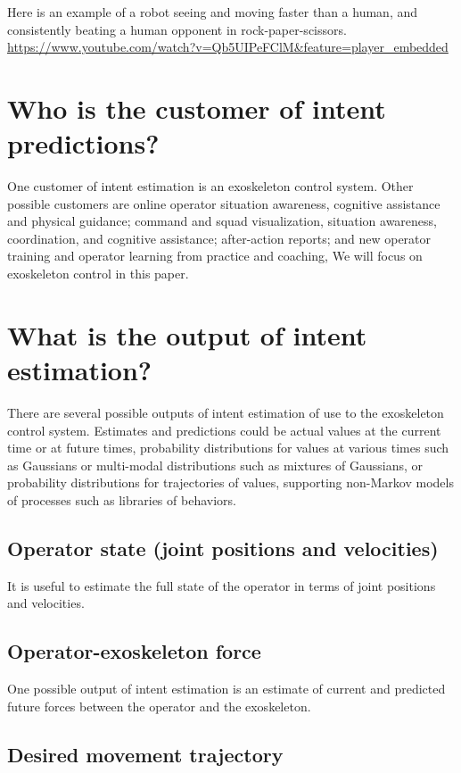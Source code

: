 \documentclass[letterpaper,12pt,fullpage]{article}
\begin{document}
Here is an example of a robot seeing and moving faster than a human, and
consistently beating a human opponent in rock-paper-scissors.\\
\url{https://www.youtube.com/watch?v=Qb5UIPeFClM&feature=player_embedded}

\section{Who is the customer of intent predictions?}

One customer of intent estimation is an exoskeleton control system.
Other possible customers are online operator situation awareness,
cognitive assistance
and physical guidance;
command and squad visualization, situation awareness,
coordination, and cognitive assistance;
after-action reports; and new operator training and
operator learning from practice and coaching,
We will focus on exoskeleton control in this paper.

\section{What is the output of intent estimation?}

There are several possible outputs of intent estimation of use to the
exoskeleton control system.
Estimates and predictions could be actual values at the current time or at
future times, probability distributions for
values at various times such as Gaussians or multi-modal distributions 
such as mixtures of Gaussians, or probability distributions for trajectories
of values, supporting non-Markov models of processes such as libraries
of behaviors.

\subsection{Operator state (joint positions and velocities)}

It is useful to estimate the full state of the operator in terms
of joint positions and velocities.

\subsection{Operator-exoskeleton force}

One possible output of intent estimation is an estimate of current
and predicted future forces between the operator and the exoskeleton.

\subsection{Desired movement trajectory}
\end{document}
